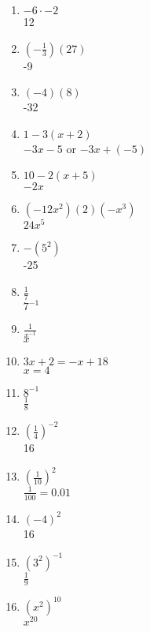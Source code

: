 \documentclass[12pt]{article}
\begin{document}
\begin{multicols}{2}
\begin{enumerate}
	\item \( -6 \cdot -2 \) \\
		12

	\item \( (-\frac{1}{3})(27) \) \\
		-9

	\item \( (-4) (8) \) \\
		-32

	\item \( 1 - 3(x+2) \) \\
		\( -3x - 5 \) or \( -3x + (-5) \)

	\item \( 10 - 2(x+5) \) \\
		\( -2x \)

	\item \( (-12x^{2})(2)(-x^{3}) \) \\
		\( 24x^{5} \)

	\item \( -(5^{2}) \) \\
		-25

	\item \( \frac{1}{7} \) \\
		\( 7^{-1} \)

	\item \( \frac{1}{x^{-1}} \) \\
		\( x \)

	\item \( 3x + 2 = -x + 18 \) \\
		\( x = 4 \)

	\item \( 8^{-1} \) \\
		\( \frac{1}{8} \)

	\item \( (\frac{1}{4})^{-2} \) \\
		16

	\item \( (\frac{1}{10})^{2} \) \\
		\( \frac{1}{100} = 0.01 \)

	\item \( (-4)^{2} \) \\
		16

	\item \( (3^{2})^{-1} \) \\
		\( \frac{1}{9} \)

	\item \( (x^{2})^{10} \) \\
		\( x^{20} \)


\end{enumerate}
\end{multicols}
\end{document}

